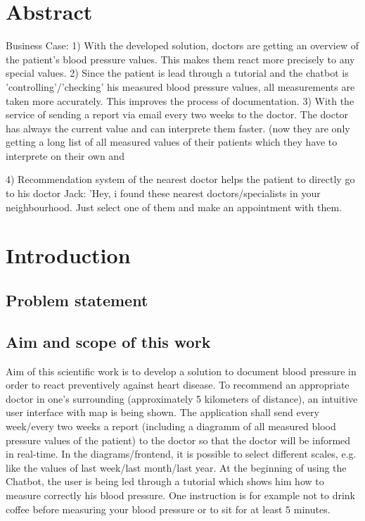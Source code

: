 



\chapter{Abstract}\label{abstract}

Business Case:
1) With the developed solution, doctors are getting an overview of the patient's blood pressure values. This makes them react more precisely to any special values. 
2) Since the patient is lead through a tutorial and the chatbot is 'controlling'/'checking' his measured blood pressure values, all measurements are taken more accurately. This improves the process of documentation.
3) With the service of sending a report via email every two weeks to the doctor. The doctor has always the current value and can interprete them faster. (now they are only getting a long list of all measured values of their patients which they have to interprete on their own and \begin{flushleft}
\end{flushleft}
4) Recommendation system of the nearest doctor helps the patient to directly go to his doctor 
Jack: 'Hey, i found these nearest doctors/specialists in your neighbourhood. Just select one of them and make an appointment with them. 

\chapter{Introduction}\label{introduction}

\section{Problem statement}

\section{Aim and scope of this work}
Aim of this scientific work is to develop a solution to document blood pressure in order to react preventively against heart disease.
To recommend an appropriate doctor in one's surrounding (approximately 5 kilometers of distance), an intuitive user interface with map is being shown.
The application shall send every week/every two weeks a report (including a diagramm of all measured blood pressure values of the patient) to the doctor so that the doctor will be informed in real-time. In the diagrams/frontend, it is possible to select different scales, e.g. like the values of last week/last month/last year. 
At the beginning of using the Chatbot, the user is being led through a tutorial which shows him how to measure correctly his blood pressure. One instruction is for example not to drink coffee before measuring your blood pressure or to sit for at least 5 minutes.

